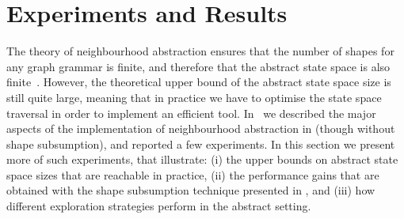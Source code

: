 

\section{Experiments and Results}

The theory of neighbourhood abstraction ensures that the number of shapes for
any graph grammar is finite, and therefore that the abstract state space is also
finite~\cite{BBKR08}. However, the theoretical upper bound of the abstract
state space size is still quite large, meaning that in practice we have to
optimise the state space traversal in order to implement an efficient tool.
In~\cite{RZ10} we described the major aspects of the implementation of
neighbourhood abstraction in \GROOVE (though without shape subsumption), and
reported a few experiments. In this section we present more of
such experiments, that illustrate: (i) the upper bounds on abstract state space
sizes that are reachable in practice, (ii) the performance gains that are
obtained with the shape subsumption technique presented in ,
and (iii) how different exploration strategies perform in the abstract setting.

